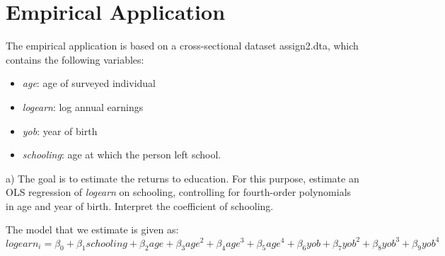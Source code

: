 \documentclass[a4paper,12pt,oneside,English]{article}
\begin{document}
\newpage
\section{Empirical Application}

The empirical application is based on a cross-sectional dataset assign2.dta, which contains the following variables:
\begin{itemize}
    \item \textit{age}: age of surveyed individual
    \item \textit{logearn}: log annual earnings
    \item \textit{yob}: year of birth
    \item \textit{schooling}: age at which the person left school.
\end{itemize}
a) The goal is to estimate the returns to education. For this purpose, estimate an OLS regression of \textit{logearn} on schooling, controlling for fourth-order polynomials in age and year of birth. Interpret the coefficient of schooling.

The model that we estimate is given as:
\begin{equation}
    logearn_i = \beta_0 + \beta_1 {schooling} + \beta_2 {age} + \beta_3 {age^2} + \beta_4 {age^3} + \beta_5 {age^4} + \beta_6 {yob} + \beta_7 {yob^2} + \beta_8 {yob^3} + \beta_9 {yob^4}
\end{equation}
\end{document}
